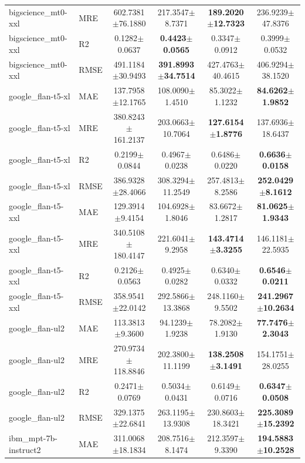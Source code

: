 \begin{table}[t]
\begin{tabular}{llcccc}
bigscience\_mt0-xxl & MRE & 602.7381$\pm$76.1880 & 217.3547$\pm$8.7371 & \textbf{189.2020$\pm$12.7323} & 236.9239$\pm$47.8376 \\
bigscience\_mt0-xxl & R2 & 0.1282$\pm$0.0637 & \textbf{0.4423$\pm$0.0565} & 0.3347$\pm$0.0912 & 0.3999$\pm$0.0532 \\
bigscience\_mt0-xxl & RMSE & 491.1184$\pm$30.9493 & \textbf{391.8993$\pm$34.7514} & 427.4763$\pm$40.4615 & 406.9294$\pm$38.1520 \\
\addlinespace
google\_flan-t5-xl & MAE & 137.7958$\pm$12.1765 & 108.0090$\pm$1.4510 & 85.3022$\pm$1.1232 & \textbf{84.6262$\pm$1.9852} \\
google\_flan-t5-xl & MRE & 380.8243$\pm$161.2137 & 203.0663$\pm$10.7064 & \textbf{127.6154$\pm$1.8776} & 137.6936$\pm$18.6437 \\
google\_flan-t5-xl & R2 & 0.2199$\pm$0.0844 & 0.4967$\pm$0.0238 & 0.6486$\pm$0.0220 & \textbf{0.6636$\pm$0.0158} \\
google\_flan-t5-xl & RMSE & 386.9328$\pm$28.4066 & 308.3294$\pm$11.2549 & 257.4813$\pm$8.2586 & \textbf{252.0429$\pm$8.1612} \\
\addlinespace
google\_flan-t5-xxl & MAE & 129.3914$\pm$9.4154 & 104.6928$\pm$1.8046 & 83.6672$\pm$1.2817 & \textbf{81.0625$\pm$1.9343} \\
google\_flan-t5-xxl & MRE & 340.5108$\pm$180.4147 & 221.6041$\pm$9.2958 & \textbf{143.4714$\pm$3.3255} & 146.1181$\pm$22.5935 \\
google\_flan-t5-xxl & R2 & 0.2126$\pm$0.0563 & 0.4925$\pm$0.0282 & 0.6340$\pm$0.0332 & \textbf{0.6546$\pm$0.0211} \\
google\_flan-t5-xxl & RMSE & 358.9541$\pm$22.0142 & 292.5866$\pm$13.3868 & 248.1160$\pm$9.5502 & \textbf{241.2967$\pm$10.2634} \\
\addlinespace
google\_flan-ul2 & MAE & 113.3813$\pm$9.3600 & 94.1239$\pm$1.9238 & 78.2082$\pm$1.9130 & \textbf{77.7476$\pm$2.3043} \\
google\_flan-ul2 & MRE & 270.9734$\pm$118.8846 & 202.3800$\pm$11.1199 & \textbf{138.2508$\pm$3.1491} & 154.1751$\pm$28.0255 \\
google\_flan-ul2 & R2 & 0.2471$\pm$0.0769 & 0.5034$\pm$0.0431 & 0.6149$\pm$0.0716 & \textbf{0.6347$\pm$0.0508} \\
google\_flan-ul2 & RMSE & 329.1375$\pm$22.6841 & 263.1195$\pm$13.9308 & 230.8603$\pm$18.3421 & \textbf{225.3089$\pm$15.2392} \\
\addlinespace
ibm\_mpt-7b-instruct2 & MAE & 311.0068$\pm$18.1834 & 208.7516$\pm$8.1474 & 212.3597$\pm$9.3390 & \textbf{194.5883$\pm$10.2528} \\

\end{tabular}
\end{table}
